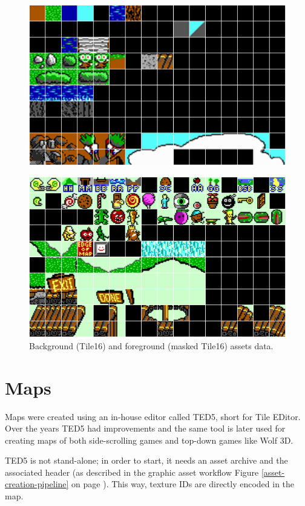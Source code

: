 \documentclass[book.tex]{subfiles}
\begin{document}
\begin{figure}[H] 
  \centering 
  \includegraphics[width=\textwidth, frame]{screenshots_300dpi/tile16_assets.png}
\end{figure} 

\begin{figure}[H] 
  \centering 
  \includegraphics[width=\textwidth, frame]{screenshots_300dpi/tile16M_assets.png}
  \caption{Background (Tile16) and foreground (masked Tile16) assets data.}
  \label{fig:tile16_assets}
\end{figure} 



\section{Maps}
Maps were created using an in-house editor called TED5, short for Tile EDitor. Over the years TED5 had improvements and the same tool is later used for creating maps of both side-scrolling games and top-down games like Wolf 3D.\\
\par
 TED5 is not stand-alone; in order to start, it needs an asset archive and the  associated header (as described in the graphic asset workflow Figure \ref{asset-creation-pipeline} on page \pageref{asset-creation-pipeline}). This way, texture IDs are directly encoded in the map.\\
\end{document}
